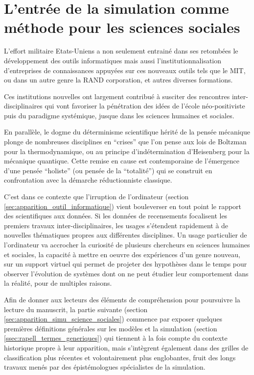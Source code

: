 
\section{L'entrée de la simulation comme méthode pour les sciences sociales}

L'effort militaire Etats-Uniens a non seulement entrainé dans ses retombées le développement des outils informatiques mais aussi l'institutionnalisation d'entreprises de connaissances appuyées sur ces nouveaux outils tels que le MIT, ou dans un autre genre la RAND corporation, et autres diverses formations.

Ces institutions nouvelles ont largement contribué à susciter des rencontres inter-disciplinaires qui vont favoriser la pénétration des idées de l'école néo-positiviste puis du paradigme systémique, jusque dans les sciences humaines et sociales.

En parallèle, le dogme du déterminisme scientifique hérité de la pensée mécanique plonge de nombreuses disciplines en \enquote{crises} \autocite[20-23]{Pouvreau2013} que l'on pense aux lois de Boltzman pour la thermodynamique, ou au principe d’indétermination d'Heisenberg pour la mécanique quantique. Cette remise en cause est contemporaine de l'émergence d'une pensée \enquote{holiste} (ou pensée de la \enquote{totalité}) qui se construit en confrontation avec la démarche réductionniste classique.

C'est dans ce contexte que l'irruption de l'ordinateur (section \ref{sec:apparition_outil_informatique}) vient bouleverser en tout point le rapport des scientifiques aux données. Si les données de recensements focalisent les premiers travaux inter-disciplinaires, les usages s'étendent rapidement à de nouvelles thématiques propres aux différentes disciplines. Un usage particulier de l'ordinateur va accrocher la curiosité de plusieurs chercheurs en sciences humaines et sociales, la capacité à mettre en oeuvre des expériences d'un genre nouveau, sur un support virtuel qui permet de projeter des hypothèses dans le temps pour observer l'évolution de systèmes dont on ne peut étudier leur comportement dans la réalité, pour de multiples raisons.  

Afin de donner aux lecteurs des éléments de compréhension pour poursuivre la lecture du manuscrit, la partie suivante (section \ref{sec:apparition_simu_science_sociales}) commence par exposer quelques premières définitions générales sur les modèles et la simulation (section \ref{ssec:rapell_termes_generiques}) qui tiennent à la fois compte du contexte historique propre à leur apparition, mais s'intègrent également dans des grilles de classification plus récentes et volontairement plus englobantes, fruit des longs travaux menés par des épistémologues spécialistes de la simulation.

